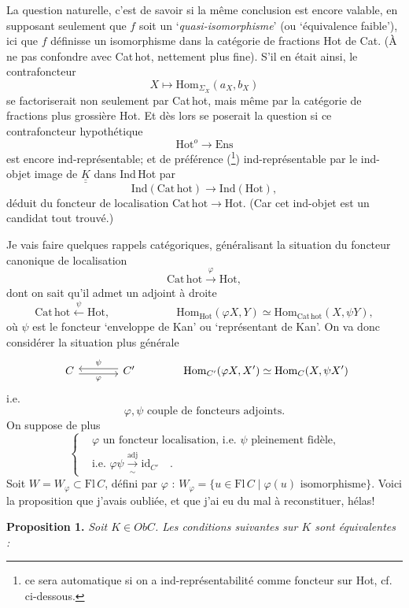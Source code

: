 \documentclass[11pt]{article}
\newcommand{\printedpage}[1]{\marginpar{\footnotesize p.~#1}}
\newcommand{\msp}[1]{\marginpar{\footnotesize [#1]}}
\newcommand{\KK}{\underline{\underline{K}}}
\newcommand{\Cathot}{\mathrm{Cat\,hot}}
\begin{document}
La question naturelle, c'est de savoir si la même conclusion est encore valable, en supposant seulement que $f$ soit un ‘\textit{quasi-isomorphisme}’ (ou ‘équivalence faible’), ici que $f$ définisse un isomorphisme dans la catégorie de fractions Hot de Cat. (À ne pas confondre avec Cat\,hot,
\printedpage{22}
\msp{page 36}
nettement plus fine). S'il en était ainsi, le contrafoncteur
\[
X\longmapsto\mathrm{Hom}_{\Sigma_X}(a_X,b_X)
\]
se factoriserait non seulement par Cat\,hot, mais même par la catégorie de fractions plus grossière Hot. Et dès lors se poserait la question si ce contrafoncteur hypothétique
\[
\mathrm{Hot}^{o}\longrightarrow\mathrm{Ens}
\]
est encore ind-représentable; et de préférence (\footnote[5]{ce sera automatique si on a ind-représentabilité comme foncteur sur Hot, cf. ci-dessous.}) ind-représentable par le ind-objet image de $\KK$ dans Ind\,Hot par
\[
\mathrm{Ind}(\Cathot)\longrightarrow\mathrm{Ind}(\mathrm{Hot}),
\]
déduit du foncteur de localisation $\Cathot\longrightarrow\mathrm{Hot}$. (Car cet ind-objet est un candidat tout trouvé.)

\msp{page 37}
Je vais faire quelques rappels catégoriques, généralisant la situation du foncteur canonique de localisation
\[
\Cathot\xrightarrow{\ \varphi\ }\mathrm{Hot},
\]
dont on sait qu'il admet un adjoint à droite
\[
\Cathot\xleftarrow{\ \psi\ }\mathrm{Hot}, \qquad\qquad\qquad \mathrm{Hom}_{\mathrm{Hot}}(\varphi X,Y)\simeq\mathrm{Hom}_{\Cathot}(X,\psi Y),
\]
où $\psi$ est le foncteur ‘enveloppe de Kan’ ou ‘représentant de Kan’. On va donc considérer la situation plus générale
\[
\begin{tikzcd}[column sep=large]
C \arrow[r, shift right=1, "\varphi"'] & C' \arrow[l, shift right=1, "\psi"']
\end{tikzcd}
\qquad\qquad \mathrm{Hom}_{C'}(\varphi X,X')\simeq\mathrm{Hom}_{C}(X,\psi X')
\]
i.e.
\[
\varphi,\psi \text{ couple de foncteurs adjoints.}
\]
On suppose de plus
\[
\left\{
\begin{aligned}
&\varphi \text{ un foncteur localisation, i.e. } \psi \text{ pleinement fidèle,}\\
&\text{i.e. } \varphi\psi\xrightarrow[\sim]{\text{adj}}\mathrm{id}_{C'} \quad .
\end{aligned}
\right.
\]
Soit $W=W_{\varphi}\subset\mathrm{Fl}\,C$, défini par $\varphi$ : $W_{\varphi}=\{u\in\mathrm{Fl}\,C\mid\varphi(u)\text{ isomorphisme}\}$. Voici la proposition que j'avais oubliée, et que j'ai eu du mal à reconstituer, hélas!

\textbf{Proposition 1.} \textit{Soit $K\in \mathit{Ob}C$. Les conditions suivantes sur $K$ sont équivalentes :}
\end{document}
